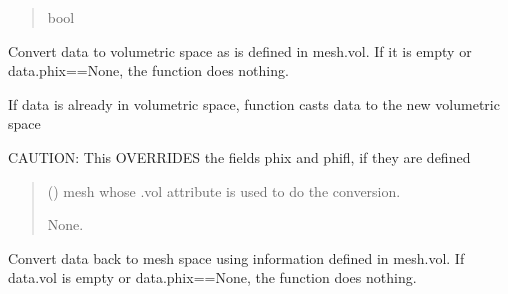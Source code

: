 \documentclass[letterpaper,10pt,english]{sphinxmanual}
\begin{document}
\begin{fulllineitems}
\begin{fulllineitems}
\begin{quote}
\begin{description}
\sphinxAtStartPar
bool

\end{description}\end{quote}

\end{fulllineitems}


\begin{fulllineitems}
\label{\detokenize{_autosummary/nirfasterff.base.data.flTRMomentsdata:nirfasterff.base.data.flTRMomentsdata.togrid}}
\pysigstartsignatures
\pysiglinewithargsret
{}
{}
{}
\pysigstopsignatures
\sphinxAtStartPar
Convert data to volumetric space as is defined in mesh.vol. If it is empty or data.phix==None, the function does nothing.

\sphinxAtStartPar
If data is already in volumetric space, function casts data to the new volumetric space

\sphinxAtStartPar
CAUTION: This OVERRIDES the fields phix and phifl, if they are defined
\begin{quote}\begin{description}
\sphinxAtStartPar
{} () \textendash{} mesh whose .vol attribute is used to do the conversion.

\sphinxAtStartPar
None.

\end{description}\end{quote}

\end{fulllineitems}


\begin{fulllineitems}
\label{\detokenize{_autosummary/nirfasterff.base.data.flTRMomentsdata:nirfasterff.base.data.flTRMomentsdata.tomesh}}
\pysigstartsignatures
\pysiglinewithargsret
{}
{}
{}
\pysigstopsignatures
\sphinxAtStartPar
Convert data back to mesh space using information defined in mesh.vol. If data.vol is empty or data.phix==None, the function does nothing.


\end{fulllineitems}
\end{fulllineitems}
\end{document}
